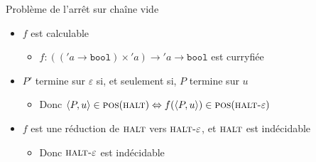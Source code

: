 \begin{frame}{Problème de l'arrêt sur chaîne vide}
{    \vspace{1mm}
    \begin{itemize}
    \item $f$ est calculable
      \begin{itemize}
      \item {} $f : (('a \rightarrow \texttt{bool}) \times {'a}) \rightarrow 'a \rightarrow \texttt{bool}$ est curryfiée
      \end{itemize}
    \item $P'$ termine sur $\varepsilon$ si, et seulement si, $P$ termine sur $u$
      \begin{itemize}
      \item Donc $\langle P,u \rangle \in \textsc{pos}(\textsc{halt}) \Leftrightarrow f(\langle P,u \rangle) \in \textsc{pos}(\textsc{halt-}\varepsilon)$
      \end{itemize}
    \item $f$ est une réduction de $\textsc{halt}$ vers $\textsc{halt-}\varepsilon$, et $\textsc{halt}$ est indécidable
      \begin{itemize}
      \item Donc $\textsc{halt-}\varepsilon$ est indécidable
      \end{itemize}
    \end{itemize}
  }
\end{frame}

\endgroup
